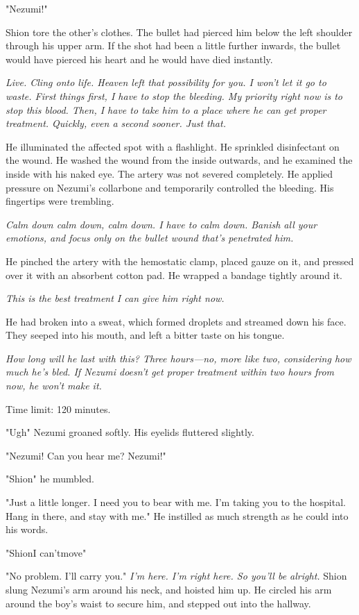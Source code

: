 "Nezumi!"

Shion tore the other's clothes. The bullet had pierced him below the
left shoulder through his upper arm. If the shot had been a little
further inwards, the bullet would have pierced his heart and he would
have died instantly.

\emph{Live. Cling onto life. Heaven left that possibility for you. I won't let
it go to waste. First things first, I have to stop the bleeding. My
priority right now is to stop this blood. Then, I have to take him to a
place where he can get proper treatment. Quickly, even a second sooner.
Just that.}

He illuminated the affected spot with a flashlight. He sprinkled
disinfectant on the wound. He washed the wound from the inside outwards,
and he examined the inside with his naked eye. The artery was not
severed completely. He applied pressure on Nezumi's collarbone and
temporarily controlled the bleeding. His fingertips were trembling.

\emph{Calm down calm down, calm down. I have to calm down. Banish all your
emotions, and focus only on the bullet wound that's penetrated him.}

He pinched the artery with the hemostatic clamp, placed gauze on it, and
pressed over it with an absorbent cotton pad. He wrapped a bandage
tightly around it.

\emph{This is the best treatment I can give him right now.}

He had broken into a sweat, which formed droplets and streamed down his
face. They seeped into his mouth, and left a bitter taste on his tongue.

\emph{How long will he last with this? Three hours---no, more like two,
considering how much he's bled. If Nezumi doesn't get proper treatment
within two hours from now, he won't make it.}

Time limit: 120 minutes.

"Ugh\el " Nezumi groaned softly. His eyelids fluttered slightly.

"Nezumi! Can you hear me? Nezumi!"

"\el Shion\el " he mumbled.

"Just a little longer. I need you to bear with me. I'm taking you to the
hospital. Hang in there, and stay with me." He instilled as much
strength as he could into his words.

"\el Shion\el I can't\el move\el "

"No problem. I'll carry you." \emph{I'm here. I'm right here. So you'll be
alright.} Shion slung Nezumi's arm around his neck, and hoisted him up.
He circled his arm around the boy's waist to secure him, and stepped out
into the hallway.

